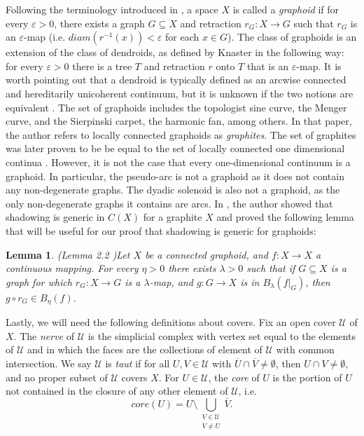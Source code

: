 \documentclass{amsart}
\newtheorem{lemma}[theorem]{Lemma}
\numberwithin{equation}{section}
\begin{document}
Following the terminology introduced in \cite{genericshadowingmeddaugh}, a space $X$ is called a \emph{graphoid} if for every $\varepsilon>0$, there exists a graph $G\subseteq X$ and retraction $r_G:X\to G$ such that $r_G$ is an $\varepsilon$-map (i.e. $diam(r^{-1}(x))<\varepsilon$ for each $x\in G$). The class of graphoids is an extension of the class of dendroids, as defined by Knaster in the following way: for every $\varepsilon>0$ there is a tree $T$ and retraction $r$ onto $T$ that is an $\varepsilon$-map.  It is worth pointing out that a dendroid is typically defined as an arcwise connected and hereditarily unicoherent continuum, but it is unknown if the two notions are equivalent \cite{pearl2011open}. The set of graphoids includes the topologist sine curve, the Menger curve, and the Sierpinski carpet, the harmonic fan, among others. In that paper, the author refers to locally connected graphoids as \emph{graphites}. The set of graphites was later proven to be be equal to the set of locally connected one dimensional continua \cite{peanovejnar}. However, it is not the case that every one-dimensional continuum is a graphoid. In particular, the pseudo-arc is not a graphoid as it does not contain any non-degenerate graphs. The dyadic solenoid is also not a graphoid, as the only non-degenerate graphs it contains are arcs. In \cite{genericshadowingmeddaugh}, the author showed that shadowing is generic in $C(X)$ for a graphite $X$ and proved the following lemma that will be useful for our proof that shadowing is generic for graphoids:


\begin{lemma}{(Lemma 2.2 \cite{genericshadowingmeddaugh})}\label{graphoidlemma22}
Let $X$ be a connected graphoid, and $f:X\to X$ a continuous mapping. For every $\eta >0$ there exists $\lambda>0$ such that if $G\subseteq X$ is a graph for which $r_G: X\to G$ is a $\lambda$-map, and $g:G \to X$ is in $B_\lambda(f|_G)$, then $g\circ r_G\in B_\eta(f).$
\end{lemma}


Lastly, we will need the following definitions about covers. Fix an open cover $\mathcal{U}$ of $X$. The \emph{nerve} of $\mathcal{U}$ is the simplicial complex with vertex set equal to the elements of $\mathcal{U}$ and in which the faces are the collections of element of $\mathcal{U}$ with common intersection. We say $\mathcal{U}$ is \emph{taut} if for all $U,V\in \mathcal{U}$ with $\overline{U}\cap\overline{V}\neq \emptyset$, then $U\cap V\neq \emptyset$, and no proper subset of $\mathcal{U}$ covers $X$. For $U\in \mathcal{U}$, the \emph{core} of $U$ is the portion of $U$ not contained in the closure of any other element of $\mathcal U$, i.e.\[core(U)=U\setminus \displaystyle\bigcup_{\substack{V\in \mathcal{U}\\ V\neq U}}\overline{V}.\]
\end{document}
